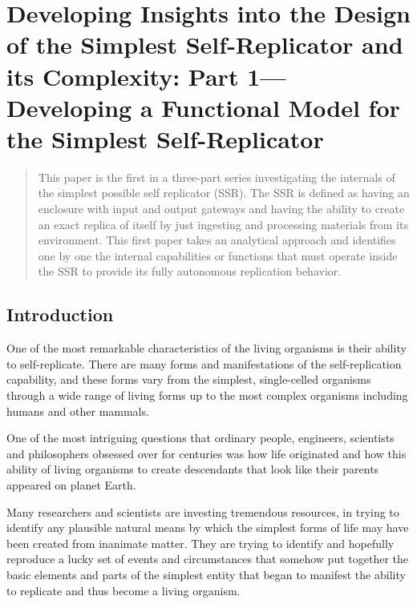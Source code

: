 
\newcommand\migneafigure[3]{
	\begin{figure}
		\centering
		\texttt{[image: \#1]}
		\caption{{#2}}
		\label{#3}
	\end{figure}
}
\newcommand\mterm[1]{\emph{#1}}
\newcommand\memph[1]{\emph{#1}}

\chapter[The Simplest Self-Replicator, Part 1]{Developing Insights into the Design of the Simplest Self-Replicator and its Complexity: Part 1---Developing a Functional Model for the Simplest Self-Replicator}


\begin{abstract}
This paper is the first in a three-part series investigating the internals 
of the simplest possible self replicator (SSR). 
The SSR is defined as having an enclosure with input
and output gateways and having the ability to create an exact replica
of itself by just ingesting and processing materials from its
environment. This first paper takes an analytical approach and identifies one
by one the internal capabilities or functions that must operate inside
the SSR to provide its fully autonomous replication behavior. 
\end{abstract}

\section{Introduction}

One of the most remarkable characteristics of the living organisms is
their ability to self-replicate. There are many forms and
manifestations of the self-replication capability, and these forms vary
from the simplest, single-celled organisms through a wide range of
living forms up to the most complex organisms including humans and
other mammals.

One of the most intriguing questions that ordinary people, engineers,
scientists and philosophers obsessed over for centuries was how life
originated and how this ability of living organisms to create
descendants that look like their parents appeared on planet Earth. 

Many researchers and scientists
are investing tremendous resources, in trying to identify any plausible
natural means by which the simplest forms of life may have been created
from inanimate matter. They are trying to identify and hopefully
reproduce a lucky set of events and circumstances that somehow put
together the basic elements and parts of the simplest entity that began
to manifest the ability to replicate and thus become a living organism.

